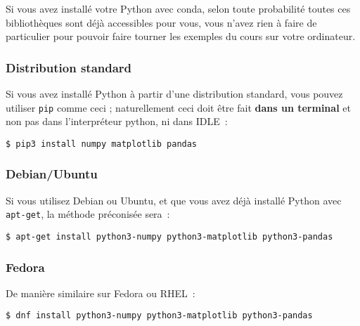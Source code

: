     Si vous avez installé votre Python avec conda, selon toute probabilité
toutes ces bibliothèques sont déjà accessibles pour vous, vous n'avez
rien à faire de particulier pour pouvoir faire tourner les exemples du
cours sur votre ordinateur.

    \hypertarget{distribution-standard}{%
\subsubsection{Distribution standard}\label{distribution-standard}}

    Si vous avez installé Python à partir d'une distribution standard, vous
pouvez utiliser \texttt{pip} comme ceci ; naturellement ceci doit être
fait \textbf{dans un terminal} et non pas dans l'interpréteur python, ni
dans IDLE~:

    \begin{verbatim}
$ pip3 install numpy matplotlib pandas
\end{verbatim}

    \hypertarget{debianubuntu}{%
\subsubsection{Debian/Ubuntu}\label{debianubuntu}}

    Si vous utilisez Debian ou Ubuntu, et que vous avez déjà installé Python
avec \texttt{apt-get}, la méthode préconisée sera~:

    \begin{verbatim}
$ apt-get install python3-numpy python3-matplotlib python3-pandas
\end{verbatim}

    \hypertarget{fedora}{%
\subsubsection{Fedora}\label{fedora}}

    De manière similaire sur Fedora ou RHEL~:

    \begin{verbatim}
$ dnf install python3-numpy python3-matplotlib python3-pandas
\end{verbatim}


    
    
    
